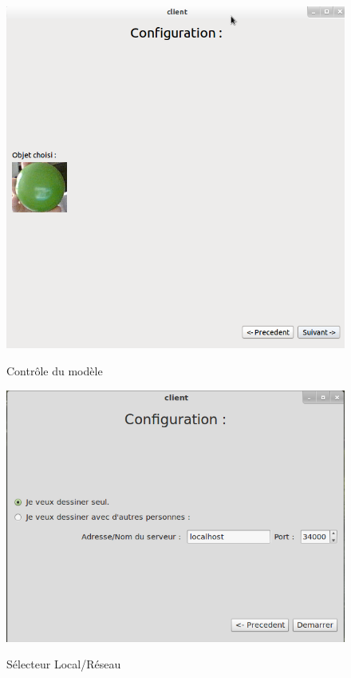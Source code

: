 \documentclass{report}
\begin{document}
				\newpage
				\begin{figure}[!h]
						\centering
						\includegraphics[scale=0.4]{../images/Capture7.png}\\
						\caption{Contrôle du modèle}
						\label{Contrôle du modèle}
				\end{figure}
				\newpage
				\begin{figure}[!h]
						\centering
						\includegraphics[scale=0.4]{../images/capture_choix.png}\\
						\caption{Sélecteur Local/Réseau}
						\label{Sélecteur Local/Réseau}
				\end{figure}
				\newpage
\end{document}
